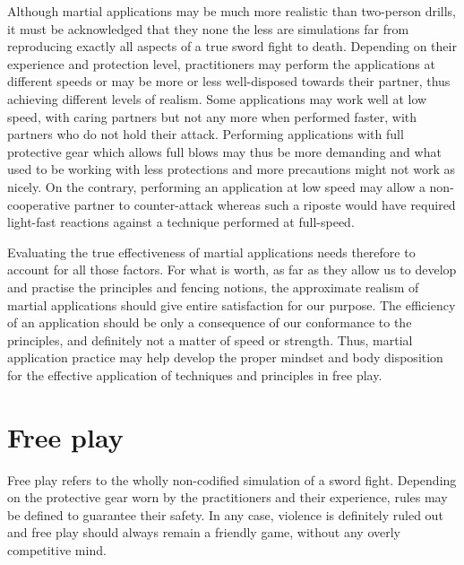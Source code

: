 Although martial applications may be much more realistic than two-person drills, it must be acknowledged that they none the less are simulations far from reproducing exactly all aspects of a true sword fight to death.
Depending on their experience and protection level, practitioners may perform the applications at different speeds or may be more or less well-disposed towards their partner, thus achieving different levels of realism. 
Some applications may work well at low speed, with caring partners but not any more when performed faster, with partners who do not hold their attack. 
Performing applications with full protective gear which allows full blows may thus be more demanding and what used to be working with less protections and more precautions might not work as nicely.
On the contrary, performing an application at low speed may allow a non-cooperative partner to counter-attack whereas such a riposte would have required light-fast reactions against a technique performed at full-speed. 

Evaluating the true effectiveness of martial applications needs therefore to account for all those factors.
For what is worth, as far as they allow us to develop and practise the \Taiji{} principles and fencing notions, the approximate realism of martial applications should give entire satisfaction for our purpose. The efficiency of an application should be only a consequence of our conformance to the principles, and definitely not a matter of speed or strength.
Thus, martial application practice may help develop the proper mindset and body disposition for the effective application of techniques and principles in free play.

\section{Free play}
Free play refers to the wholly non-codified simulation of a sword fight.
Depending on the protective gear worn by the practitioners and their experience, rules may be defined to guarantee their safety.
In any case, violence is definitely ruled out and free play should always remain a friendly game, without any overly competitive mind.

